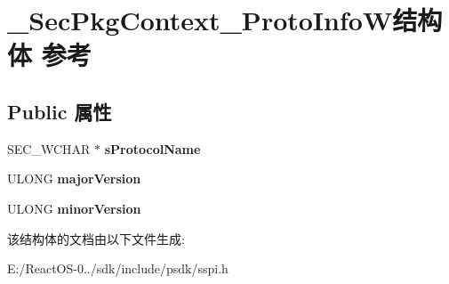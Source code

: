 \hypertarget{struct___sec_pkg_context___proto_info_w}{}\section{\+\_\+\+Sec\+Pkg\+Context\+\_\+\+Proto\+Info\+W结构体 参考}
\label{struct___sec_pkg_context___proto_info_w}
\subsection*{Public 属性}
\begin{DoxyCompactItemize}
\item 
\mbox{\label{struct___sec_pkg_context___proto_info_w_aaee3c87883726e3211f3ad3fc04ef210}} 
S\+E\+C\+\_\+\+W\+C\+H\+AR $\ast$ {\bfseries s\+Protocol\+Name}
\item 
\mbox{\label{struct___sec_pkg_context___proto_info_w_a577574024cad5632f5d2d95d16758ec5}} 
U\+L\+O\+NG {\bfseries major\+Version}
\item 
\mbox{\label{struct___sec_pkg_context___proto_info_w_afd093729ad6cea3e5683996d62e4a302}} 
U\+L\+O\+NG {\bfseries minor\+Version}
\end{DoxyCompactItemize}


该结构体的文档由以下文件生成\+:\begin{DoxyCompactItemize}
\item 
E\+:/\+React\+O\+S-\/0../sdk/include/psdk/sspi.\+h\end{DoxyCompactItemize}
